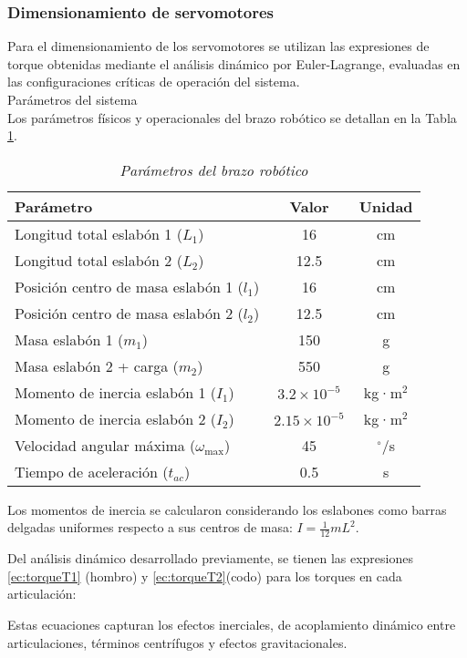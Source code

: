 \subsubsection{Dimensionamiento de servomotores}

Para el dimensionamiento de los servomotores se utilizan las expresiones de torque obtenidas mediante el análisis dinámico por Euler-Lagrange, evaluadas en las configuraciones críticas de operación del sistema.\\

Parámetros del sistema\\
\noindent
Los parámetros físicos y operacionales del brazo robótico se detallan en la Tabla \ref{tab:parametros_brazo}.

\begin{table}[htbp]
\centering
\begin{tabular}{lcc}
\hline
\textbf{Parámetro} & \textbf{Valor} & \textbf{Unidad} \\
\hline
Longitud total eslabón 1 ($L_1$) & 16 & cm \\
Longitud total eslabón 2 ($L_2$) & 12.5 & cm \\
Posición centro de masa eslabón 1 ($l_1$) & 16 & cm \\
Posición centro de masa eslabón 2 ($l_2$) & 12.5 & cm \\
Masa eslabón 1 ($m_1$) & 150 & g \\
Masa eslabón 2 + carga ($m_2$) & 550 & g \\
Momento de inercia eslabón 1 ($I_1$) & $3.2 \times 10^{-5}$ & kg·m$^2$ \\
Momento de inercia eslabón 2 ($I_2$) & $2.15 \times 10^{-5}$ & kg·m$^2$ \\
Velocidad angular máxima ($\omega_{\max}$) & 45 & $^{\circ}$/s \\
Tiempo de aceleración ($t_{ac}$) & 0.5 & s \\
\hline
\end{tabular}
\caption{\textit{Parámetros del brazo robótico}}
\label{tab:parametros_brazo}
\end{table}

Los momentos de inercia se calcularon considerando los eslabones como barras delgadas uniformes respecto a sus centros de masa: $I = \frac{1}{12}mL^2$.

Del análisis dinámico desarrollado previamente, se tienen las expresiones \ref{ec:torqueT1} (hombro) y \ref{ec:torqueT2}(codo) para los torques en cada articulación:

Estas ecuaciones capturan los efectos inerciales, de acoplamiento dinámico entre articulaciones, términos centrífugos y efectos gravitacionales. \\

